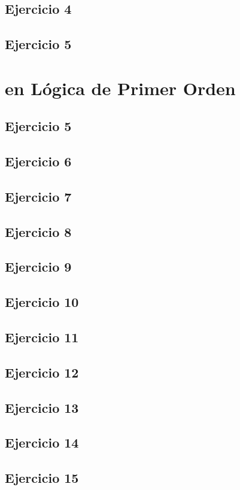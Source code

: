 \documentclass[10pt,a4paper]{article}
\begin{document}
  \subsection{Ejercicio 4}
  \subsection{Ejercicio 5}
  \section*{ en Lógica de Primer Orden}
  \subsection{Ejercicio 5}
  \subsection{Ejercicio 6}
  \subsection{Ejercicio 7}
  \subsection{Ejercicio 8}
  \subsection{Ejercicio 9}
  \subsection{Ejercicio 10}
  \subsection{Ejercicio 11}
  \subsection{Ejercicio 12}
  \subsection{Ejercicio 13}
  \subsection{Ejercicio 14}
  \subsection{Ejercicio 15}
\end{document}
